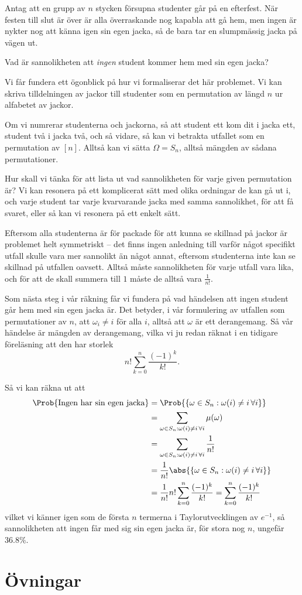 \documentclass[nobib]{tufte-handout}
\begin{document}
\begin{example}
    Antag att en grupp av $n$ stycken försupna studenter går på en efterfest. När festen till slut är över är alla överraskande nog kapabla att gå hem, men ingen är nykter nog att känna igen sin egen jacka, så de bara tar en slumpmässig jacka på vägen ut.

    Vad är sannolikheten att \emph{ingen} student kommer hem med sin egen jacka?

    Vi får fundera ett ögonblick på hur vi formaliserar det här problemet. Vi kan skriva tilldelningen av jackor till studenter som en permutation av längd $n$ ur alfabetet av jackor. 
    
    Om vi numrerar studenterna och jackorna, så att student ett kom dit i jacka ett, student två i jacka två, och så vidare, så kan vi betrakta utfallet som en permutation av $[n]$. Alltså kan vi sätta $\Omega = S_n$, alltså mängden av sådana permutationer.

    Hur skall vi tänka för att lista ut vad sannolikheten för varje given permutation är? Vi kan resonera på ett komplicerat sätt med olika ordningar de kan gå ut i, och varje student tar varje kvarvarande jacka med samma sannolikhet, för att få svaret, eller så kan vi resonera på ett enkelt sätt.

    Eftersom alla studenterna är för packade för att kunna se skillnad på jackor är problemet helt symmetriskt -- det finns ingen anledning till varför något specifikt utfall skulle vara mer sannolikt än något annat, eftersom studenterna inte kan se skillnad på utfallen oavsett. Alltså måste sannolikheten för varje utfall vara lika, och för att de skall summera till $1$ måste de alltså vara $\frac{1}{n!}$.

    Som nästa steg i vår räkning får vi fundera på vad händelsen att ingen student går hem med sin egen jacka är. Det betyder, i vår formulering av utfallen som permutationer av $n$, att $\omega_i \neq i$ för alla $i$, alltså att $\omega$ är ett derangemang. Så vår händelse är mängden av derangemang, vilka vi ju redan räknat i en tidigare föreläsning att den har storlek
    $$n!\sum_{k=0}^{n} \frac{(-1)^k}{k!}.$$

    Så vi kan räkna ut att
    \begin{align*}
        \Prob{\text{Ingen har sin egen jacka}} &= \Prob{\left\{\omega \in S_n: \omega(i) \neq i\, \forall i\right\}}\\
        &= \sum_{\omega \in S_n: \omega(i) \neq i\, \forall i} \mu(\omega)\\
        &= \sum_{\omega \in S_n: \omega(i) \neq i\, \forall i} \frac{1}{n!}\\
        &= \frac{1}{n!}\abs{\left\{\omega \in S_n: \omega(i) \neq i\, \forall i\right\}}\\
        &= \frac{1}{n!}n!\sum_{k=0}^{n} \frac{(-1)^k}{k!} = \sum_{k=0}^{n} \frac{(-1)^k}{k!}
    \end{align*}
    vilket vi känner igen som de första $n$ termerna i Taylorutvecklingen av $e^{-1}$, så sannolikheten att ingen får med sig sin egen jacka är, för stora nog $n$, ungefär $36.8\%$.
\end{example}

\section{Övningar}

%
%
\end{document}
